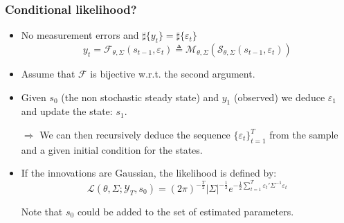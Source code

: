 \documentclass[10pt]{beamer}
\begin{document}
\begin{frame}
  \frametitle{Conditional likelihood?}

  \begin{itemize}
  \item No measurement errors and $\sharp\{y_t\}=\sharp\{\varepsilon_t\}$
    \[
      y_t = \mathcal F_{\theta,\Sigma} \left(s_{t-1}, \varepsilon_t\right) \triangleq \mathcal M_{\theta,\Sigma}\left(\mathcal S_{\theta,\Sigma}(s_{t-1}, \varepsilon_t)\right)
    \]
    
    \bigskip

  \item Assume that $\mathcal F$ is bijective w.r.t. the second argument.

    \bigskip

  \item Given $s_0$ (the non stochastic steady state) and $y_1$ (observed) we deduce $\varepsilon_1$ and update the state: $s_1$.\newline

    $\Rightarrow$ We can then recursively deduce the sequence $\{\varepsilon_t\}_{t=1}^T$ from the sample and a given initial condition for the states.\newline

    \bigskip

  \item If the innovations are Gaussian, the likelihood is defined by:
    \[
      \mathcal L(\theta, \Sigma; \mathcal Y_T, s_0) = (2\pi)^{-\frac{T}{2}}|\Sigma|^{-\frac{1}{2}}e^{-\frac{1}{2}\sum_{t=1}^T \varepsilon_t'\Sigma^{-1}\varepsilon_t}
    \]

    \bigskip

    Note that $s_0$ could be added to the set of estimated parameters.

  \end{itemize}
\end{frame}
\end{document}
